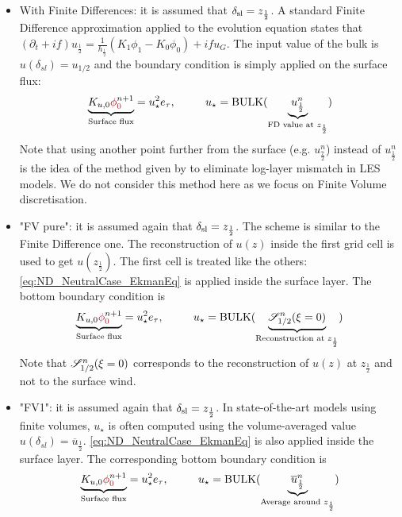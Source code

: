   \begin{itemize}
	  \item With Finite Differences:
		  it is assumed that
		  $\delta_{\rm sl} = z_{\frac{1}{2}}$.
		A standard Finite Difference approximation applied to
		  the evolution equation states that
		  $(\partial_t+if) u_{\frac{1}{2}}
		  =\frac{1}{h_{\frac{1}{2}}}(K_1\phi_1 - K_0\phi_0)
		  + if u_G$.
		  The input value of the bulk is
		  $u(\delta_{sl}) = u_{1/2}$ and the boundary
		  condition is simply applied on the surface flux:
		\begin{equation}
			\underbrace{K_{u,0}
			\emphase{\phi}^{n+1}_\emphase{0}}_{\text{Surface flux}}
		= u_\star^2 e_\tau, ~~~~~~~~
			u_\star = {\rm BULK}(
			\underbrace{u_{\frac{1}{2}}^{n}}_{
				\text{FD value at }
			z_{\frac{1}{2}}})
		\end{equation}
		  Note that using another point further from
		  the surface (e.g. $u_{\frac{7}{2}}^n$) instead
		  of $u_{\frac{1}{2}}^n$ is the idea of the method
		  given by \citep{kawai_wall-modeling_2012}
		  to eliminate log-layer mismatch in LES models.
		  We do not consider this method here as we focus
		  on Finite Volume discretisation.
	  \item "FV pure": it is assumed again that
		  $\delta_{\rm sl} = z_{\frac{1}{2}}$.
		  The scheme is similar to the Finite Difference one.
	    The reconstruction of $u(z)$ inside the first grid cell
		  is used to get $u(z_{\frac{1}{2}})$.
		  The first cell is treated like the others:
		  \eqref{eq:ND_NeutralCase_EkmanEq} is
		  applied inside the surface layer.
	The bottom boundary condition is
	\begin{equation}
		\underbrace{K_{u,0} \emphase{\phi}^{n+1}_\emphase{0}}_{\text{Surface flux}}
		= u_\star^2 e_\tau, ~~~~~~~~
			u_\star = {\rm BULK}(
			\underbrace{{\cal S}_{1/2}^{n}(\xi=0)}_{
				\text{Reconstruction at }
			z_{\frac{1}{2}}})
	\end{equation}
		  Note that ${\cal S}_{1/2}^{n}(\xi=0)$ corresponds
		  to the reconstruction of $u(z)$ at
		  $z_{\frac{1}{2}}$ and not to the surface wind.
	  \item "FV1": it is assumed again that
		  $\delta_{\rm sl} = z_{\frac{1}{2}}$.
		  In state-of-the-art models using finite volumes,
		  $u_{\star}$ is often computed using the
		  volume-averaged value
		  $u(\delta_{sl}) = \overline{u}_{\frac{1}{2}}$.
		  \eqref{eq:ND_NeutralCase_EkmanEq} is
		  also applied inside the surface layer.
		The corresponding bottom boundary condition is
		  \begin{equation}
		\underbrace{K_{u,0} \emphase{\phi}^{n+1}_\emphase{0}}_{\text{Surface flux}}
		= u_\star^2 e_\tau, ~~~~~~~~
			u_\star = {\rm BULK}(
			\underbrace{\overline{u}^{n}_{\frac{1}{2}}}_{
				\text{Average around }
			z_{\frac{1}{2}}})
		  \end{equation}
\end{itemize}
